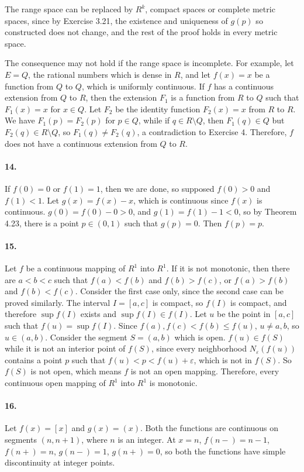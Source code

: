 \documentclass[a4paper]{article}
\begin{document}
The range space can be replaced by $R^k$, compact spaces or complete metric spaces, since by Exercise 3.21, the existence and uniqueness of $g(p)$ so constructed does not change, and the rest of the proof holds in every metric space.

The consequence may not hold if the range space is incomplete. For example, let $E=Q$, the rational numbers which is dense in $R$, and let $f(x)=x$ be a function from $Q$ to $Q$, which is uniformly continuous. If $f$ has a continuous extension from $Q$ to $R$, then the extension $F_1$ is a function from $R$ to $Q$ such that $F_1(x)=x$ for $x\in Q$. Let $F_2$ be the identity function $F_2(x)=x$ from $R$ to $R$. We have $F_1(p)=F_2(p)$ for $p\in Q$, while if $q\in R\setminus Q$, then $F_1(q)\in Q$ but $F_2(q)\in R\setminus Q$, so $F_1(q)\neq F_2(q)$, a contradiction to Exercise 4. Therefore, $f$ does not have a continuous extension from $Q$ to $R$.

\paragraph{14.}
If $f(0)=0$ or $f(1)=1$, then we are done, so supposed $f(0)>0$ and $f(1)< 1$. Let $g(x)=f(x)-x$, which is continuous since $f(x)$ is continuous. $g(0)=f(0)-0>0$, and $g(1)=f(1)-1<0$, so by Theorem 4.23, there is a point $p\in(0,1)$ such that $g(p)=0$. Then $f(p)=p$.

\paragraph{15.}
Let $f$ be a continuous mapping of $R^1$ into $R^1$. If it is not monotonic, then there are $a<b<c$ such that $f(a)<f(b)$ and $f(b)>f(c)$, or $f(a)>f(b)$ and $f(b)<f(c)$. Consider the first case only, since the second case can be proved similarly. The interval $I=[a,c]$ is compact, so $f(I)$ is compact, and therefore $\sup f(I)$ exists and $\sup f(I)\in f(I)$. Let $u$ be the point in $[a,c]$ such that $f(u)=\sup f(I)$. Since $f(a),f(c)<f(b)\leq f(u)$,\; $u\neq a,b$, so $u\in (a,b)$. Consider the segment $S=(a,b)$ which is open. $f(u)\in f(S)$ while it is not an interior point of $f(S)$, since every neighborhood $N_\varepsilon(f(u))$ contains a point $p$ such that $f(u)<p<f(u)+\varepsilon$, which is not in $f(S)$. So $f(S)$ is not open, which means $f$ is not an open mapping. Therefore, every continuous open mapping of $R^1$ into $R^1$ is monotonic.

\paragraph{16.}
Let $f(x)=[x]$ and $g(x)=(x)$. Both the functions are continuous on segments $(n,n+1)$, where $n$ is an integer. At $x=n$,\; $f(n-)=n-1$,\; $f(n+)=n$,\; $g(n-)=1$,\; $g(n+)=0$, so both the functions have simple discontinuity at integer points.
\end{document}

